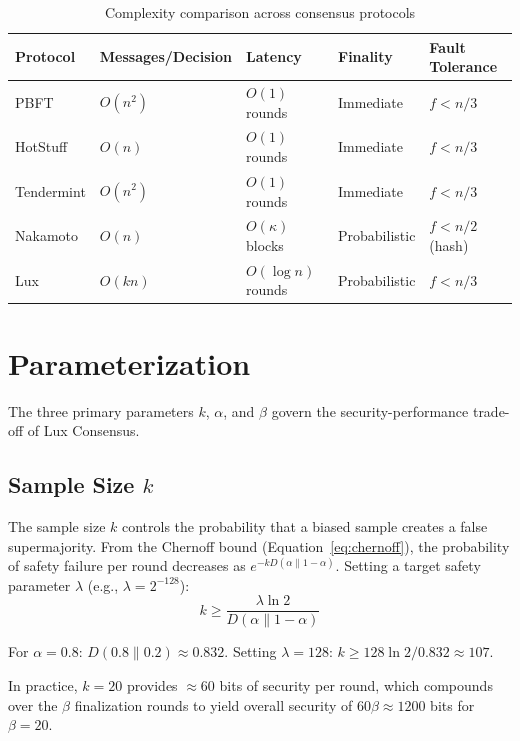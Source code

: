 \documentclass[11pt,a4paper]{article}
\begin{document}
\begin{table}[h]
\centering
\caption{Complexity comparison across consensus protocols}
\label{tab:complexity}
\begin{tabular}{@{}lllll@{}}
\toprule
Protocol & Messages/Decision & Latency & Finality & Fault Tolerance \\
\midrule
PBFT & $O(n^2)$ & $O(1)$ rounds & Immediate & $f < n/3$ \\
HotStuff & $O(n)$ & $O(1)$ rounds & Immediate & $f < n/3$ \\
Tendermint & $O(n^2)$ & $O(1)$ rounds & Immediate & $f < n/3$ \\
Nakamoto & $O(n)$ & $O(\kappa)$ blocks & Probabilistic & $f < n/2$ (hash) \\
Lux & $O(kn)$ & $O(\log n)$ rounds & Probabilistic & $f < n/3$ \\
\bottomrule
\end{tabular}
\end{table}

\section{Parameterization}
\label{sec:params}

The three primary parameters $k$, $\alpha$, and $\beta$ govern the security-performance
trade-off of Lux Consensus.

\subsection{Sample Size $k$}

The sample size $k$ controls the probability that a biased sample creates a false
supermajority. From the Chernoff bound (Equation~\ref{eq:chernoff}), the probability of
safety failure per round decreases as $e^{-kD(\alpha \| 1-\alpha)}$. Setting a target
safety parameter $\lambda$ (e.g., $\lambda = 2^{-128}$):
\begin{equation}
k \geq \frac{\lambda \ln 2}{D(\alpha \| 1-\alpha)}
\label{eq:k_lower_bound}
\end{equation}

For $\alpha = 0.8$: $D(0.8 \| 0.2) \approx 0.832$.
Setting $\lambda = 128$: $k \geq 128 \ln 2 / 0.832 \approx 107$.

In practice, $k = 20$ provides $\approx 60$ bits of security per round, which compounds
over the $\beta$ finalization rounds to yield overall security of $60\beta \approx 1200$
bits for $\beta = 20$.
\end{document}
